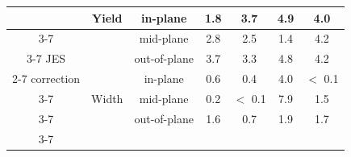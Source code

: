 \begin{table}[!htbp]
\begin{tabular}{c | c | c | c | c | c | c}
		\multirow{6}{*}{} & \multirow{3}{*}{Yield} & in-plane & 1.8 & 3.7 & 4.9 & 4.0  \\ \cline{3-7}
		& & mid-plane & 2.8 & 2.5 & 1.4 & 4.2 \\ \cline{3-7}
		JES & & out-of-plane & 3.7 & 3.3 & 4.8 & 4.2 \\ \cline{2-7}
		correction & \multirow{3}{*}{Width} & in-plane & 0.6 & 0.4 & 4.0 & $<$ 0.1 \\ \cline{3-7}
		& & mid-plane    & 0.2 & $<$ 0.1  & 7.9 & 1.5 \\ \cline{3-7}
		& & out-of-plane & 1.6 & 0.7 & 1.9 & 1.7 \\ \cline{3-7}
		
		\hline
	\end{tabular}
\end{table}

